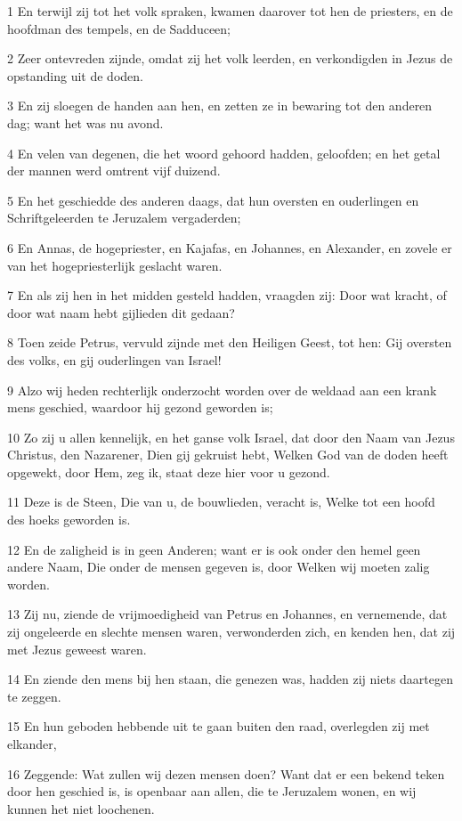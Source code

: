 \par 1 En terwijl zij tot het volk spraken, kwamen daarover tot hen de priesters, en de hoofdman des tempels, en de Sadduceen;
\par 2 Zeer ontevreden zijnde, omdat zij het volk leerden, en verkondigden in Jezus de opstanding uit de doden.
\par 3 En zij sloegen de handen aan hen, en zetten ze in bewaring tot den anderen dag; want het was nu avond.
\par 4 En velen van degenen, die het woord gehoord hadden, geloofden; en het getal der mannen werd omtrent vijf duizend.
\par 5 En het geschiedde des anderen daags, dat hun oversten en ouderlingen en Schriftgeleerden te Jeruzalem vergaderden;
\par 6 En Annas, de hogepriester, en Kajafas, en Johannes, en Alexander, en zovele er van het hogepriesterlijk geslacht waren.
\par 7 En als zij hen in het midden gesteld hadden, vraagden zij: Door wat kracht, of door wat naam hebt gijlieden dit gedaan?
\par 8 Toen zeide Petrus, vervuld zijnde met den Heiligen Geest, tot hen: Gij oversten des volks, en gij ouderlingen van Israel!
\par 9 Alzo wij heden rechterlijk onderzocht worden over de weldaad aan een krank mens geschied, waardoor hij gezond geworden is;
\par 10 Zo zij u allen kennelijk, en het ganse volk Israel, dat door den Naam van Jezus Christus, den Nazarener, Dien gij gekruist hebt, Welken God van de doden heeft opgewekt, door Hem, zeg ik, staat deze hier voor u gezond.
\par 11 Deze is de Steen, Die van u, de bouwlieden, veracht is, Welke tot een hoofd des hoeks geworden is.
\par 12 En de zaligheid is in geen Anderen; want er is ook onder den hemel geen andere Naam, Die onder de mensen gegeven is, door Welken wij moeten zalig worden.
\par 13 Zij nu, ziende de vrijmoedigheid van Petrus en Johannes, en vernemende, dat zij ongeleerde en slechte mensen waren, verwonderden zich, en kenden hen, dat zij met Jezus geweest waren.
\par 14 En ziende den mens bij hen staan, die genezen was, hadden zij niets daartegen te zeggen.
\par 15 En hun geboden hebbende uit te gaan buiten den raad, overlegden zij met elkander,
\par 16 Zeggende: Wat zullen wij dezen mensen doen? Want dat er een bekend teken door hen geschied is, is openbaar aan allen, die te Jeruzalem wonen, en wij kunnen het niet loochenen.
